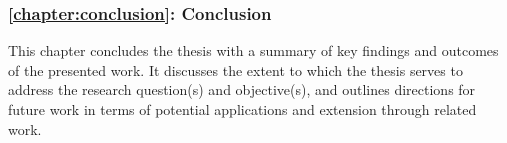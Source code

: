 \subsubsection*{\autoref{chapter:conclusion}: Conclusion}
This chapter concludes the thesis with a summary of key findings and outcomes of the presented work. It discusses the extent to which the thesis serves to address the research question(s) and objective(s), and outlines directions for future work in terms of potential applications and extension through related work.
